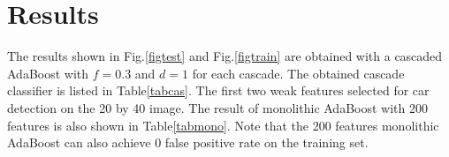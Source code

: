 \documentclass[12pt]{article}
\begin{document}

\section{Results}
The results shown in Fig.\ref{figtest} and Fig.\ref{figtrain} are obtained with a cascaded AdaBoost with $f=0.3$ and $d=1$ for each cascade. The obtained cascade classifier is listed in Table\ref{tabcas}. The first two weak features selected for car detection on the 20 by 40 image. The result of monolithic AdaBoost with 200 features is also shown in Table\ref{tabmono}. Note that the 200 features monolithic AdaBoost can also achieve 0 false positive rate on the training set.
\end{document}
